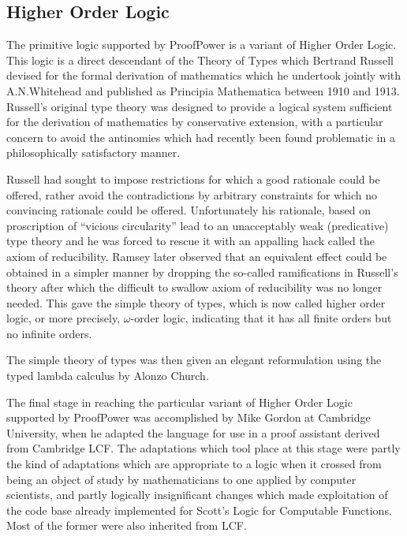 \documentclass{rbjk}
\begin{document}
\begin{article}
\subsection{Higher Order Logic}

The primitive logic supported by ProofPower is a variant of Higher
Order Logic.
This logic is a direct descendant of the Theory of Types\cite{russell08} which
Bertrand Russell devised for the formal derivation of mathematics
which he undertook jointly with A.N.Whitehead and published as
Principia Mathematica between 1910 and 1913\cite{whitehead10}.
Russell's original type theory was designed to provide a logical
system sufficient for the derivation of mathematics by conservative
extension, with a particular concern to avoid the antinomies which had
recently been found problematic in a philosophically satisfactory
manner.

Russell had sought to impose restrictions for which a good rationale
could be offered, rather avoid the contradictions by arbitrary
constraints for which no convincing rationale could be offered.
Unfortunately his rationale, based on proscription of ``vicious
circularity'' lead to an unacceptably weak (predicative) type theory
and he was forced to rescue it with an appalling hack called the axiom
of reducibility.
Ramsey later observed that an equivalent effect could be obtained in a
simpler manner by dropping the so-called ramifications in Russell's
theory after which the difficult to swallow axiom of reducibility was
no longer needed.
This gave the simple theory of types, which is now called higher order
logic, or more precisely, $\omega$-order logic, indicating that it has
all finite orders but no infinite orders.

The simple theory of types was then given an elegant reformulation
using the typed lambda calculus by Alonzo Church\cite{church40}.

The final stage in reaching the particular variant of Higher Order
Logic supported by ProofPower was accomplished by Mike Gordon at
Cambridge University, when he adapted the language for use in a proof
assistant derived from Cambridge LCF.
The adaptations which tool place at this stage were partly the kind of
adaptations which are appropriate to a logic when it crossed from
being an object of study by mathematicians to one applied by computer
scientists, and partly logically insignificant changes which made
exploitation of the code base already implemented for Scott's Logic
for Computable Functions.
Most of the former were also inherited from LCF.


\end{article}
\end{document}
